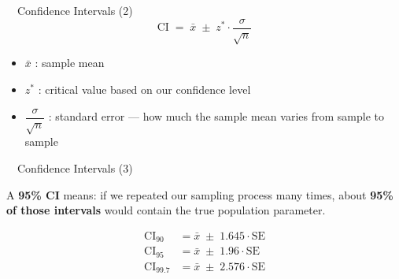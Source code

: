 \documentclass[aspectratio=169,11pt]{beamer}
\begin{document}
\begin{frame}{\ \ Confidence Intervals (2)}
  \begin{equation*}
    \text{CI} \;=\; \bar{x} \;\pm\; z^{*}\cdot\frac{\sigma}{\sqrt{n}}
  \end{equation*}
  \vspace{0.2em}
  \begin{itemize}
    \item $\bar{x}$ : sample mean
    \item $z^{*}$ : critical value based on our confidence level
    \item $\dfrac{\sigma}{\sqrt{n}}$ : standard error --- how much the sample mean
          varies from sample to sample
  \end{itemize}
\end{frame}

\begin{frame}{\ \ Confidence Intervals (3)}
  \begin{keybox}[Interpretation]
    A \textbf{95\% CI} means: if we repeated our sampling process many times,
    about \textbf{95\% of those intervals} would contain the true population
    parameter.
  \end{keybox}
  \vspace{0.8em}
  \begin{center}
  \begin{align*}
    \text{CI}_{90}   &= \bar{x} \;\pm\; 1.645\cdot \text{SE}\\[0.3em]
    \text{CI}_{95}   &= \bar{x} \;\pm\; 1.96\cdot \text{SE}\\[0.3em]
    \text{CI}_{99.7} &= \bar{x} \;\pm\; 2.576\cdot \text{SE}
  \end{align*}
  \end{center}
\end{frame}
\end{document}
